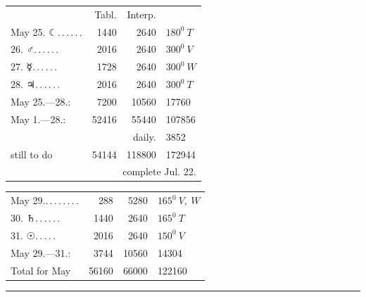 \clearpage
\begingroup
{}
\renewcommand{\headrulewidth}{0pt}
\begingroup
\newcommand{\BJournalDay}[1]{{\upshape\AstroSymbols #1}}
\small\itshape
\begin{center}
\begin{tabular}{@{}p{.36\linewidth}rrl@{}}
&Tabl.&Interp.&\\
May 25. \BJournalDay{☾}\nobreak\hspace{.2em}\mbox{.\,.\,.\,.\,.\,.}\hfill&1440&2640&\(\mathit{180}^0\ T\)\\
\hfill 26. \BJournalDay{♂}\nobreak\hspace{.2em}\mbox{.\,.\,.\,.\,.\,.}\hfill&2016&2640&\(\mathit{300}^0\ V\)\\
\hfill 27. \BJournalDay{☿}\nobreak\hspace{.2em}\mbox{.\,.\,.\,.\,.\,.}\hfill&1728&2640&\(\mathit{300}^0\ W\)\\
\hfill 28. \BJournalDay{♃}\nobreak\hspace{.2em}\mbox{.\,.\,.\,.\,.\,.}\hfill&2016&2640&\(\mathit{300}^0\ T\)\\
\hfill May 25.—28.:&7200&10560&17760\\
\hfill May 1.—28.:&52416&55440&107856\\
&&daily.&3852\\
\hfill still to do&54144&118800&172944\\
\multicolumn{4}{r}{complete Jul. 22.}\\
\hline
\end{tabular}
\end{center}
\begin{center}
\begin{tabular}{@{}p{.36\linewidth}rrl@{}}
May 29.\nobreak\hspace{.2em}\mbox{.\,.\,.\,.\,.\,.\,.\,.}\hfill&288&5280&\(\mathit{165}^0\ V,\ W\)\\
\hfill 30. \BJournalDay{♄}\nobreak\hspace{.2em}\mbox{.\,.\,.\,.\,.\,.}\hfill&1440&2640&\(\mathit{165}^0\ T\)\\
\hfill 31. \BJournalDay{☉}\nobreak\hspace{.2em}\mbox{.\,.\,.\,.\,.}\hfill&2016&2640&\(\mathit{150}^0\ V\)\\
\hfill May 29.—31.:&3744&10560&14304\\
Total for May&56160&66000&122160
\end{tabular}\par\smallskip\rule{.25\linewidth}{.3pt}
\end{center}
